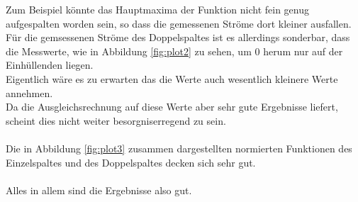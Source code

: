 Zum Beispiel könnte das Hauptmaxima der Funktion nicht fein genug aufgespalten worden sein, so dass die gemessenen Ströme dort kleiner ausfallen. \\
Für die gemsessenen Ströme des Doppelspaltes ist es allerdings sonderbar, dass die Messwerte, wie in Abbildung \ref{fig:plot2} zu sehen, um $0$ herum nur auf der Einhüllenden liegen.\\
Eigentlich wäre es zu erwarten das die Werte auch wesentlich kleinere Werte annehmen.\\
Da die Ausgleichsrechnung auf diese Werte aber sehr gute Ergebnisse liefert, scheint dies nicht weiter besorgniserregend zu sein.\\\\
Die in Abbildung \ref{fig:plot3} zusammen dargestellten normierten Funktionen des Einzelspaltes und des Doppelspaltes decken sich sehr gut.\\\\
Alles in allem sind die Ergebnisse also gut.